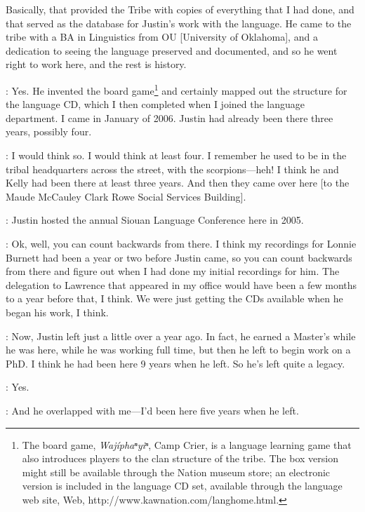 \documentclass[output=paper]{LSP/langsci}
\begin{document}
Basically, that provided the Tribe with copies of everything that I had done, and that served as the database for Justin's work with the language. He came to the tribe with a BA in Linguistics from OU [University of Oklahoma], and a dedication to seeing the language preserved and documented, and so he went right to work here, and the rest is history.

: Yes. He invented the board game\footnote{The board game, \textit{Waj\'iphaⁿyiⁿ}, Camp Crier, is a  language learning game that also introduces players to the clan structure of the  tribe. The box version might still be available through the  Nation museum store; an electronic version is included in the  language CD set, available through the  language web site, Web, {http://www.kawnation.com/langhome.html}.} and certainly mapped out the structure for the language CD, which I then completed when I joined the language department. I came in January of 2006. Justin had already been there three years, possibly four.

: I would think so. I would think at least four. I remember he used to be in the tribal headquarters across the street, with the scorpions---heh! I think he and Kelly had been there at least three years. And then they came over here [to the Maude McCauley Clark Rowe Social Services Building].

: Justin hosted the annual Siouan Language Conference here in 2005. 

: Ok, well, you can count backwards from there. I think my recordings for Lonnie Burnett had been a year or two before Justin came, so you can count backwards from there and figure out when I had done my initial recordings for him. The delegation to Lawrence that appeared in my office would have been a few months to a year before that, I think. We were just getting the CDs available when he began his work, I think.

: Now, Justin left just a little over a year ago. In fact, he earned a Master's while he was here, while he was working full time, but then he left to begin work on a PhD. I think he had been here 9 years when he left. So he's left quite a legacy.

: Yes.

: And he overlapped with me---I'd been here five years when he left.
\end{document}
